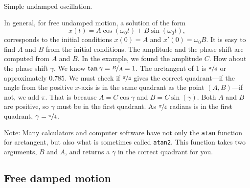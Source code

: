 \begin{mywrapfig}[15]{3.25in}
\capstart
{}
\caption{Simple undamped oscillation.\label{mv:undampedfig}}
\end{mywrapfig}

In general, for free undamped motion, a solution of the
form
\begin{equation*}
x(t) = A \cos (\omega_0 t) + B \sin (\omega_0 t) ,
\end{equation*}
corresponds to the initial conditions $x(0) = A$ and $x'(0) = \omega_0 B$.
It is easy to find $A$ and $B$ from the initial
conditions. 
The amplitude and the phase shift are computed from $A$ and $B$.
In the example, we found the amplitude $C$.
How about the phase shift $\gamma$.
We know $\tan \gamma = \nicefrac{B}{A} = 1$.
The arctangent of $1$ is $\nicefrac{\pi}{4}$ or approximately $0.785$.
We must check if $\nicefrac{\pi}{4}$ gives the correct
quadrant---if the angle from the positive $x$-axis is in the same quadrant as the
point $(A,B)$---if not, we add $\pi$.
That is because $A = C \cos \gamma$ and $B = C \sin(\gamma)$.
Both $A$ and $B$ are positive, so $\gamma$ must be in the first
quadrant.  As $\nicefrac{\pi}{4}$ radians is in the first quadrant,
$\gamma = \nicefrac{\pi}{4}$.

Note: Many
calculators and computer software have not only the
\texttt{atan} function
for arctangent, but also what is sometimes called \texttt{atan2}.
This function
takes two arguments, $B$ and $A$, and returns a $\gamma$ in the
correct quadrant for you.

\subsection{Free damped motion}


